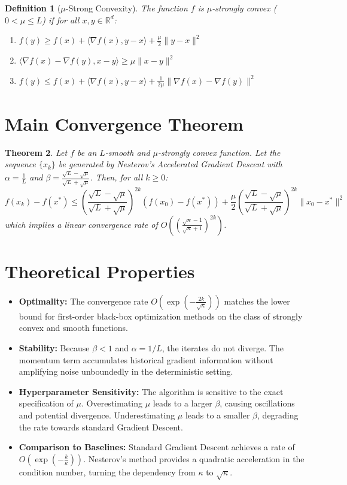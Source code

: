 \documentclass{article}
\newtheorem{theorem}{Theorem}
\newtheorem{definition}[theorem]{Definition}
\begin{document}
\begin{definition}[$\mu$-Strong Convexity]
The function $f$ is $\mu$-strongly convex ($0 < \mu \le L$) if for all $x, y \in \mathbb{R}^d$:
\begin{enumerate}
    \item $f(y) \ge f(x) + \langle \nabla f(x), y - x \rangle + \frac{\mu}{2}\|y - x\|^2$
    \item $\langle \nabla f(x) - \nabla f(y), x - y \rangle \ge \mu \|x - y\|^2$
    \item $f(y) \le f(x) + \langle \nabla f(x), y - x \rangle + \frac{1}{2\mu}\|\nabla f(x) - \nabla f(y)\|^2$
\end{enumerate}
\end{definition}

\section*{Main Convergence Theorem}
\begin{theorem}
Let $f$ be an $L$-smooth and $\mu$-strongly convex function. Let the sequence $\{x_k\}$ be generated by Nesterov's Accelerated Gradient Descent with $\alpha = \frac{1}{L}$ and $\beta = \frac{\sqrt{L} - \sqrt{\mu}}{\sqrt{L} + \sqrt{\mu}}$. Then, for all $k \ge 0$:
$$ f(x_k) - f(x^*) \le \left(\frac{\sqrt{L} - \sqrt{\mu}}{\sqrt{L} + \sqrt{\mu}}\right)^{2k} (f(x_0) - f(x^*)) + \frac{\mu}{2} \left(\frac{\sqrt{L} - \sqrt{\mu}}{\sqrt{L} + \sqrt{\mu}}\right)^{2k} \|x_0 - x^*\|^2 $$
which implies a linear convergence rate of $O\left(\left(\frac{\sqrt{\kappa}-1}{\sqrt{\kappa}+1}\right)^{2k}\right)$.
\end{theorem}

\section*{Theoretical Properties}
\begin{itemize}
    \item \textbf{Optimality:} The convergence rate $O\left(\exp\left(-\frac{2k}{\sqrt{\kappa}}\right)\right)$ matches the lower bound for first-order black-box optimization methods on the class of strongly convex and smooth functions.
    \item \textbf{Stability:} Because $\beta < 1$ and $\alpha = 1/L$, the iterates do not diverge. The momentum term accumulates historical gradient information without amplifying noise unboundedly in the deterministic setting.
    \item \textbf{Hyperparameter Sensitivity:} The algorithm is sensitive to the exact specification of $\mu$. Overestimating $\mu$ leads to a larger $\beta$, causing oscillations and potential divergence. Underestimating $\mu$ leads to a smaller $\beta$, degrading the rate towards standard Gradient Descent.
    \item \textbf{Comparison to Baselines:} Standard Gradient Descent achieves a rate of $O\left(\exp\left(-\frac{k}{\kappa}\right)\right)$. Nesterov's method provides a quadratic acceleration in the condition number, turning the dependency from $\kappa$ to $\sqrt{\kappa}$.
\end{itemize}
\end{document}
